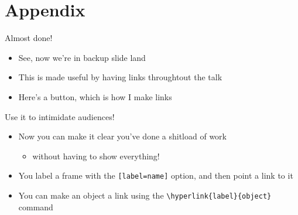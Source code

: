 \documentclass[notes, 12.5pt, aspectratio=169]{beamer}
\begin{document}
\begin{frame}[allowframebreaks]
	\printbibliography
\end{frame}

\section{Appendix}

\appendix

\begin{frame}[label=appendix_start]{Almost done!}
  \begin{itemize}
  \item See, now we're in backup slide land
  \item This is made useful by having links throughtout the talk
  \item Here's a button, which is how I make links \hyperlink{appendix_end}{}
  \end{itemize}
\end{frame}

\begin{frame}[label=appendix_end]{Use it to intimidate audiences!}
  \begin{itemize}
    \item[] Now you can make it clear you've done a shitload of work
      \begin{itemize}
      \item[]  without having to show everything! \hyperlink{appendix_start}{}
      \end{itemize}
    \item[] You label a frame with the \texttt{[label=name]} option, and then point a link to it
    \item[] You can make an object a link using the \texttt{\textbackslash hyperlink\{label\}\{object\}} command
  \end{itemize}
\end{frame}
\end{document}
